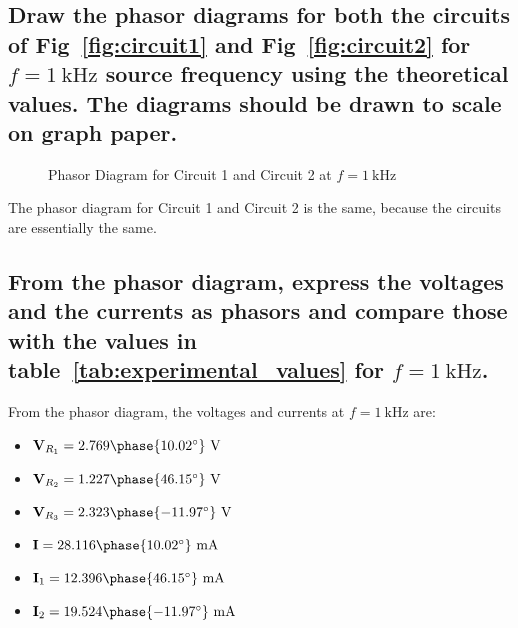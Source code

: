 \documentclass[12pt]{article}
\begin{document}
\begin{large}
	\subsection{Draw the phasor diagrams for both the circuits of Fig~\ref{fig:circuit1} and Fig~\ref{fig:circuit2} for $ f = \SI{1}{\kilo\hertz} $ source frequency using the theoretical values. The diagrams should be drawn to scale on graph paper.}
	\begin{figure}[H]
		\centering
		\caption{Phasor Diagram for Circuit 1 and Circuit 2 at $ f = \SI{1}{\kilo\hertz} $}
		\label{fig:phasor_diagram1}
	\end{figure}
	The phasor diagram for Circuit 1 and Circuit 2 is the same, because the circuits are essentially the same.

	\subsection{From the phasor diagram, express the voltages and the currents as phasors and compare those with the values in table~\ref{tab:experimental_values} for $ f = \SI{1}{\kilo\hertz} $.}
	From the phasor diagram, the voltages and currents at $ f = \SI{1}{\kilo\hertz} $ are:

	\begin{itemize}
		\item $ \mathbf{V}_{R_1} = 2.769\phase{10.02^\circ}~\SI{}{\V} $
		\item $ \mathbf{V}_{R_2} = 1.227\phase{46.15^\circ}~\SI{}{\V} $
		\item $ \mathbf{V}_{R_3} = 2.323\phase{-11.97^\circ}~\SI{}{\V} $
		\item $ \mathbf{I} = 28.116\phase{10.02^\circ}~\SI{}{\milli\A} $
		\item $ \mathbf{I}_1 = 12.396\phase{46.15^\circ}~\SI{}{\milli\A} $
		\item $ \mathbf{I}_2 = 19.524\phase{-11.97^\circ}~\SI{}{\milli\A} $
	\end{itemize}


\end{large}
\end{document}
